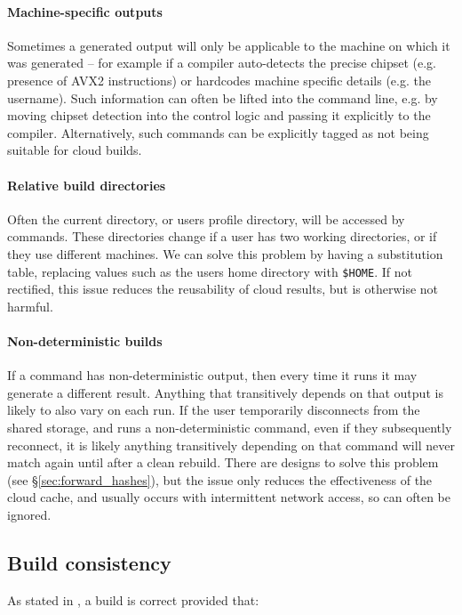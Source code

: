 \paragraph{Machine-specific outputs} Sometimes a generated output will only be applicable to the machine on which it was generated -- for example if a compiler auto-detects the precise chipset (e.g. presence of AVX2 instructions) or hardcodes machine specific details (e.g. the username). Such information can often be lifted into the command line, e.g. by moving chipset detection into the control logic and passing it explicitly to the compiler. Alternatively, such commands can be explicitly tagged as not being suitable for cloud builds.

\paragraph{Relative build directories} Often the current directory, or users profile directory, will be accessed by commands. These directories change if a user has two working directories, or if they use different machines. We can solve this problem by having a substitution table, replacing values such as the users home directory with \texttt{\$HOME}. If not rectified, this issue reduces the reusability of cloud results, but is otherwise not harmful.

\paragraph{Non-deterministic builds} If a command has non-deterministic output, then every time it runs it may generate a different result. Anything that transitively depends on that output is likely to also vary on each run. If the user temporarily disconnects from the shared storage, and runs a non-deterministic command, even if they subsequently reconnect, it is likely anything transitively depending on that command will never match again until after a clean rebuild. There are designs to solve this problem (see \S\ref{sec:forward_hashes}), but the issue only reduces the effectiveness of the cloud cache, and usually occurs with intermittent network access, so can often be ignored.

\subsection{Build consistency}
\label{sec:hazards}

As stated in \citet[\S3.6]{build_systems_a_la_carte}, a build is correct provided that:


